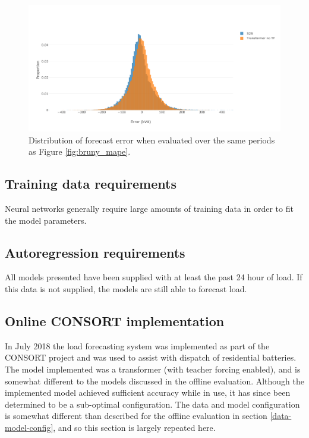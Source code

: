 \begin{figure}[htbp]
	\centerline{\includegraphics[width=.9\textwidth]{images/bruny_hist.pdf}}
	\caption{Distribution of forecast error when evaluated over the same periods as Figure \ref{fig:bruny_mape}.}
	\label{fig:bruny_hist}
\end{figure}


\subsection{Training data requirements}
Neural networks generally require large amounts of training data in order to fit the model parameters.

\subsection{Autoregression requirements}
All models presented have been supplied with at least the past 24 hour of load.
If this data is not supplied, the models are still able to forecast load.



\subsection{Online CONSORT implementation}
\label{consort-eval}
In July 2018 the load forecasting system was implemented as part of the CONSORT project and was used to assist with dispatch of residential batteries.
The model implemented was a transformer (with teacher forcing enabled), and is somewhat different to the models discussed in the offline evaluation.
Although the implemented model achieved sufficient accuracy while in use, it has since been determined to be a sub-optimal configuration.
The data and model configuration is somewhat different than described for the offline evaluation in section \ref{data-model-config}, and so this section is largely repeated here.

